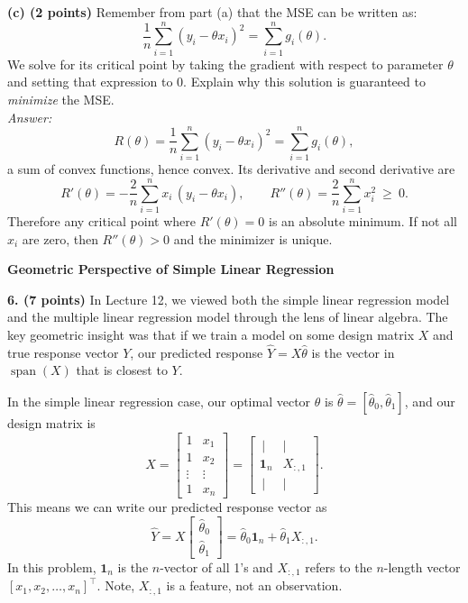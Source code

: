 \documentclass[11pt]{article}
\begin{document}
\medskip
\noindent\textbf{(c) (2 points)} Remember from part (a) that the MSE can be written as:
\[
\frac{1}{n}\sum_{i=1}^{n}(y_i-\theta x_i)^2=\sum_{i=1}^{n} g_i(\theta).
\]
We solve for its critical point by taking the gradient with respect to parameter $\theta$ and setting that expression to $0$. Explain why this solution is guaranteed to \emph{minimize} the MSE.
\medskip\\
\noindent\textit{Answer:}
\[
R(\theta)=\frac{1}{n}\sum_{i=1}^{n}(y_i-\theta x_i)^2=\sum_{i=1}^{n} g_i(\theta),
\]
a sum of convex functions, hence convex. Its derivative and second derivative are
\[
R'(\theta)=-\frac{2}{n}\sum_{i=1}^{n} x_i\,(y_i-\theta x_i),\qquad
R''(\theta)=\frac{2}{n}\sum_{i=1}^{n}x_i^2\ \ge\ 0.
\]
Therefore any critical point where $R'(\theta)=0$ is an absolute minimum. If not all $x_i$ are zero, then $R''(\theta)>0$ and the minimizer is unique.


\newpage
\noindent\textbf{\LARGE Geometric Perspective of Simple Linear Regression}

\medskip
\noindent \textbf{6. (7 points)} In Lecture 12, we viewed both the simple linear regression model and the multiple linear regression model through the lens of linear algebra. The key geometric insight was that if we train a model on some design matrix $X$ and true response vector $Y$, our predicted response $\hat{Y}=X\hat{\theta}$ is the vector in $\operatorname{span}(X)$ that is closest to $Y$.

\medskip
In the simple linear regression case, our optimal vector $\theta$ is $\hat{\theta}=[\hat{\theta}_0,\hat{\theta}_1]$, and our design matrix is
\[
X=
\begin{bmatrix}
1 & x_1\\
1 & x_2\\
\vdots & \vdots\\
1 & x_n
\end{bmatrix}
=
\begin{bmatrix}
\,| & |\,\\
\mathbf{1}_n & X_{:,1}\\
\,| & |\,
\end{bmatrix}.
\]
This means we can write our predicted response vector as
\[
\hat{Y}=X
\begin{bmatrix}
\hat{\theta}_0\\
\hat{\theta}_1
\end{bmatrix}
=\hat{\theta}_0\mathbf{1}_n+\hat{\theta}_1 X_{:,1}.
\]
In this problem, $\mathbf{1}_n$ is the $n$-vector of all 1’s and $X_{:,1}$ refers to the $n$-length vector $[x_1,x_2,\dots,x_n]^\top$. Note, $X_{:,1}$ is a feature, not an observation.
\end{document}
